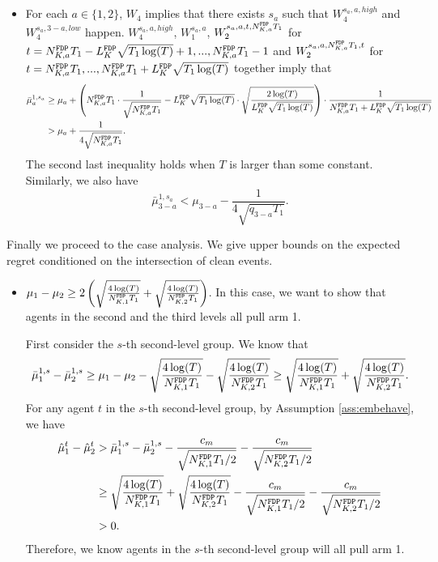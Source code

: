 {\begin{itemize}
If there are at least $T_2$ pulls of arm $a$ in the first two levels, 
\[
|\bar{\mu}_a-\mu_a| \leq \sqrt{\frac{2\log(T)}{T_2}}. 
\]

\item For each $a \in \{1,2\}$, $W_4$ implies that there exists $s_a$ such that $W_4^{s_a,a,high}$ and $W_4^{s_a,3-a,low}$ happen. $W_4^{s_a,a,high}$,  $W_1^{s_a,a}$, $W_2^{s_a,a,t, \fdpN T_1}$ for $t = \fdpN  T_1- \GdT \sqrt{T_1\log(T)}+1, ...,\fdpN T_1-1$ and $W_2^{s_a,a,\fdpN T_1,t}$ for $t= \fdpN T_1,...,\fdpN  T_1+ \GdT \sqrt{T_1\log(T)}$ together imply that 
\begin{align*}
\bar{\mu}_a ^{1,s_a} &\geq \mu_a + \left(\fdpN T_1 \cdot \frac{1}{\sqrt{\fdpN T_1}} - \GdT \sqrt{T_1\log(T)} \cdot \sqrt{\frac{2\log(T)}{ \GdT \sqrt{T_1\log(T)}}} \right) \cdot \frac{1}{\fdpN  T_1+ \GdT \sqrt{T_1\log(T)}} \\
&> \mu_a + \frac{1}{4\sqrt{\fdpN T_1}}.
\end{align*}
The second last inequality holds when $T$ is larger than some constant.
Similarly, we also have
\[
\bar{\mu}_{3-a} ^{1,s_a} < \mu_{3-a}   - \frac{1}{4\sqrt{q_{3-a} T_1}}.
\]
\end{itemize}

Finally we proceed to the case analysis. We give upper bounds on the expected regret conditioned on the intersection of clean events.

\begin{itemize}

\item $\mu_1 - \mu_2 \geq 2\left(\sqrt{\frac{4\log(T)}{\fdpN[1]T_1}} 
+ \sqrt{\frac{4\log(T)}{\fdpN[2]T_1}}\right)$. In this case, we want to show that agents in the second and the third levels all pull arm 1. 

First consider the $s$-th second-level group. We know that 
\[
\bar{\mu}_1^{1,s} - \bar{\mu}_2^{1,s} \geq \mu_1 -\mu_2 - \sqrt{\frac{4\log(T)}{\fdpN[1]T_1}} - \sqrt{\frac{4\log(T)}{\fdpN[2]T_1}} \geq  \sqrt{\frac{4\log(T)}{\fdpN[1]T_1}} + \sqrt{\frac{4\log(T)}{\fdpN[2]T_1}}.
\]
For any agent $t$ in the $s$-th second-level group, by Assumption \ref{ass:embehave}, we have
\begin{align*}
\hat{\mu}_1^t - \hat{\mu}_2^t &>\bar{\mu}_1^{1,s} - \bar{\mu}_2^{1,s} - \frac{c_m}{\sqrt{\fdpN[1]T_1/2}} - \frac{c_m}{\sqrt{\fdpN[2]T_1/2}}\\
&\geq  \sqrt{\frac{4\log(T)}{\fdpN[1]T_1}} + \sqrt{\frac{4\log(T)}{\fdpN[2]T_1}}- \frac{c_m}{\sqrt{\fdpN[1]T_1/2}} - \frac{c_m}{\sqrt{\fdpN[2]T_1/2}}\\
 &> 0.
\end{align*}
Therefore, we know agents in the $s$-th second-level group will all pull arm 1.


\end{itemize}}
